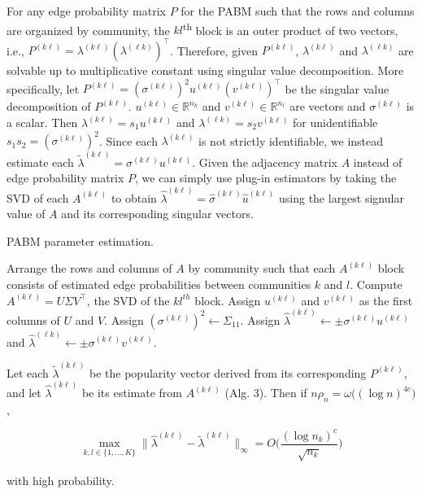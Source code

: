 \documentclass[12pt]{article}
\begin{document}
For any edge probability matrix \(P\) for the PABM such that the rows
and columns are organized by community, the \(kl\)\textsuperscript{th}
block is an outer product of two vectors, i.e.,
\(P^{(k \ell)} = \lambda^{(k \ell)} (\lambda^{(\ell k)})^\top\). Therefore, given
\(P^{(k \ell)}\), \(\lambda^{(k \ell)}\) and \(\lambda^{(\ell k)}\) are solvable
up to multiplicative constant using singular value
decomposition. More specifically, 
let \(P^{(k \ell)} = (\sigma^{(k \ell)})^2 u^{(k \ell)} (v^{(k \ell)})^\top\)
be the singular value decomposition of \(P^{(k \ell)}\).
\(u^{(k \ell)} \in \mathbb{R}^{n_k}\) and 
\(v^{(k \ell)} \in \mathbb{R}^{n_\ell}\) are vectors
and \(\sigma^{(k \ell)}\) is a scalar. 
Then \(\lambda^{(k \ell)} = s_1 u^{(k \ell)}\)
and \(\lambda^{(\ell k)} = s_2 v^{(k \ell)}\) 
for unidentifiable $s_1 s_2 = (\sigma^{(k \ell)})^2$.
Since each $\lambda^{(k \ell)}$ is not strictly identifiable,
we instead estimate each 
$\tilde{\lambda}^{(k \ell)} = \sigma^{(k \ell)} u^{(k \ell)}$. 
Given the adjacency matrix \(A\)
instead of edge probability matrix \(P\), we can simply use plug-in
estimators by taking the SVD of each $A^{(k \ell)}$ to obtain 
$\hat{\lambda}^{(k \ell)} = \hat{\sigma}^{(k \ell)} \hat{u}^{(k \ell)}$ 
using the largest signular value of $A$ and its corresponding singular vectors. 

\begin{algorithm}[t]
  \DontPrintSemicolon
  \SetAlgoLined
  \caption{PABM parameter estimation.}
  Arrange the rows and columns of $A$ by community such that each 
  $A^{(k \ell)}$ block consists of estimated edge probabilities between 
  communities $k$ and $l$.\;
   {
    Compute $A^{(k \ell)} = U \Sigma V^\top$, the SVD of the $kl^{th}$ 
    block.\;
    Assign $u^{(k \ell)}$ and $v^{(k \ell)}$ as the first columns of $U$ and $V$. 
    Assign $(\sigma^{(k \ell)})^2 \leftarrow \Sigma_{11}$.\;
    Assign $\hat{\lambda}^{(k \ell)} \leftarrow \pm \sigma^{(k \ell)} u^{(k \ell)}$ and 
    $\hat{\lambda}^{(\ell k)} \leftarrow \pm \sigma^{(k \ell)} v^{(k \ell)}$.
  }
\end{algorithm}

\begin{theorem}
\label{theorem6}
Let each $\tilde{\lambda}^{(k \ell)}$ be the popularity vector derived from its corresponding $P^{(k \ell)}$, and let $\hat{\lambda}^{(k \ell)}$ be its estimate from $A^{(k \ell)}$ (Alg. 3). Then if $n \rho_n = \omega \big( (\log n)^{4 c} \big)$,

\begin{equation} \label{eq:thm6}
\max_{k, l \in \{1, ..., K\}} 
\|\hat{\lambda}^{(k \ell)} - \tilde{\lambda}^{(k \ell)}\|_{\infty} = 
O\bigg(\frac{(\log n_k)^c}{\sqrt{n_k}} \bigg)
\end{equation}

with high probability.
\end{theorem}
\end{document}
